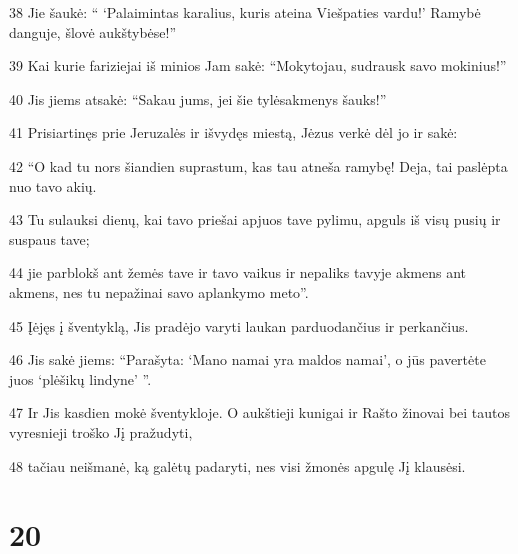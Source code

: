 \par 38 Jie šaukė: “ ‘Palaimintas karalius, kuris ateina Viešpaties vardu!’ Ramybė danguje, šlovė aukštybėse!” 
\par 39 Kai kurie fariziejai iš minios Jam sakė: “Mokytojau, sudrausk savo mokinius!” 
\par 40 Jis jiems atsakė: “Sakau jums, jei šie tylės­akmenys šauks!” 
\par 41 Prisiartinęs prie Jeruzalės ir išvydęs miestą, Jėzus verkė dėl jo ir sakė: 
\par 42 “O kad tu nors šiandien suprastum, kas tau atneša ramybę! Deja, tai paslėpta nuo tavo akių. 
\par 43 Tu sulauksi dienų, kai tavo priešai apjuos tave pylimu, apguls iš visų pusių ir suspaus tave; 
\par 44 jie parblokš ant žemės tave ir tavo vaikus ir nepaliks tavyje akmens ant akmens, nes tu nepažinai savo aplankymo meto”. 
\par 45 Įėjęs į šventyklą, Jis pradėjo varyti laukan parduodančius ir perkančius. 
\par 46 Jis sakė jiems: “Parašyta: ‘Mano namai yra maldos namai’, o jūs pavertėte juos ‘plėšikų lindyne’ ”. 
\par 47 Ir Jis kasdien mokė šventykloje. O aukštieji kunigai ir Rašto žinovai bei tautos vyresnieji troško Jį pražudyti, 
\par 48 tačiau neišmanė, ką galėtų padaryti, nes visi žmonės apgulę Jį klausėsi.



\chapter{20}


